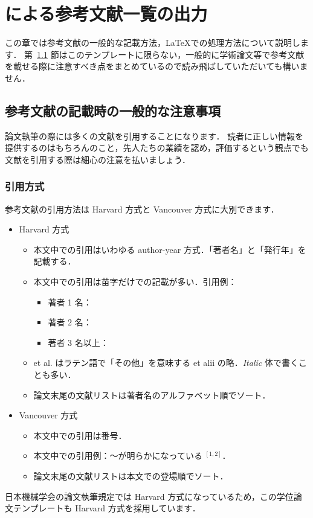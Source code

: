 \chapter{\BibTeX による参考文献一覧の出力}
\label{ch:bibtex}

この章では参考文献の一般的な記載方法，\LaTeX での処理方法について説明します．
第~\ref{sec:bibcaution} 節はこのテンプレートに限らない，一般的に学術論文等で参考文献を載せる際に注意すべき点をまとめているので読み飛ばしていただいても構いません．

\section{参考文献の記載時の一般的な注意事項}
\label{sec:bibcaution}

論文執筆の際には多くの文献を引用することになります．
読者に正しい情報を提供するのはもちろんのこと，先人たちの業績を認め，評価するという観点でも文献を引用する際は細心の注意を払いましょう．

\subsection{引用方式}
\label{ssec:citation_style}

参考文献の引用方法は Harvard 方式と Vancouver 方式に大別できます．
\begin{itemize}
    \item Harvard 方式
    \begin{itemize}
        \item 本文中での引用はいわゆる author-year 方式．「著者名」と「発行年」を記載する．
        \item 本文中での引用は苗字だけでの記載が多い．引用例：
        \begin{itemize}
            \item 著者 1 名：\cite{Reynolds:PhilTransRoySoc1883}
            \item 著者 2 名：\cite{Schmid:Springer2001}
            \item 著者 3 名以上：\cite{Berghout:JFM2020}
        \end{itemize}
        \item et al. はラテン語で「その他」を意味する et alii の略．\textit{Italic} 体で書くことも多い．
        \item 論文末尾の文献リストは著者名のアルファベット順でソート．
    \end{itemize}
    \item Vancouver 方式
    \begin{itemize}
        \item 本文中での引用は番号．
        \item 本文中での引用例：～が明らかになっている $^{[1,2]}$．
        \item 論文末尾の文献リストは本文での登場順でソート．
    \end{itemize}
\end{itemize}
日本機械学会の論文執筆規定では Harvard 方式になっているため，この学位論文テンプレートも Harvard 方式を採用しています．

